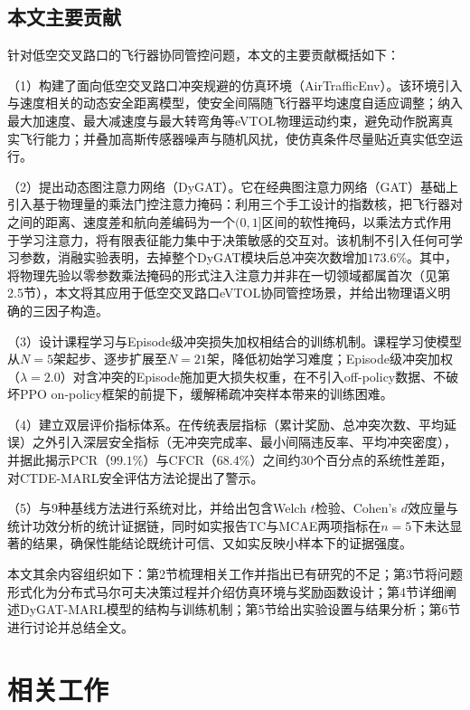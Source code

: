\documentclass[12pt,a4paper,UTF8]{ctexart}
\begin{document}
\subsection{本文主要贡献}

针对低空交叉路口的飞行器协同管控问题，本文的主要贡献概括如下：

（1）构建了面向低空交叉路口冲突规避的仿真环境（AirTrafficEnv）。该环境引入与速度相关的动态安全距离模型，使安全间隔随飞行器平均速度自适应调整；纳入最大加速度、最大减速度与最大转弯角等eVTOL物理运动约束，避免动作脱离真实飞行能力；并叠加高斯传感器噪声与随机风扰，使仿真条件尽量贴近真实低空运行。

（2）提出动态图注意力网络（DyGAT）。它在经典图注意力网络（GAT）基础上引入基于物理量的乘法门控注意力掩码：利用三个手工设计的指数核，把飞行器对之间的距离、速度差和航向差编码为一个$(0,1]$区间的软性掩码，以乘法方式作用于学习注意力，将有限表征能力集中于决策敏感的交互对。该机制不引入任何可学习参数，消融实验表明，去掉整个DyGAT模块后总冲突次数增加$173.6\%$。其中，将物理先验以零参数乘法掩码的形式注入注意力并非在一切领域都属首次（见第2.5节），本文将其应用于低空交叉路口eVTOL协同管控场景，并给出物理语义明确的三因子构造。

（3）设计课程学习与Episode级冲突损失加权相结合的训练机制。课程学习使模型从$N=5$架起步、逐步扩展至$N=21$架，降低初始学习难度；Episode级冲突加权（$\lambda=2.0$）对含冲突的Episode施加更大损失权重，在不引入off-policy数据、不破坏PPO on-policy框架的前提下，缓解稀疏冲突样本带来的训练困难。

（4）建立双层评价指标体系。在传统表层指标（累计奖励、总冲突次数、平均延误）之外引入深层安全指标（无冲突完成率、最小间隔违反率、平均冲突密度），并据此揭示PCR（$99.1\%$）与CFCR（$68.4\%$）之间约30个百分点的系统性差距，对CTDE-MARL安全评估方法论提出了警示。

（5）与9种基线方法进行系统对比，并给出包含Welch $t$检验、Cohen's $d$效应量与统计功效分析的统计证据链，同时如实报告TC与MCAE两项指标在$n=5$下未达显著的结果，确保性能结论既统计可信、又如实反映小样本下的证据强度。

本文其余内容组织如下：第2节梳理相关工作并指出已有研究的不足；第3节将问题形式化为分布式马尔可夫决策过程并介绍仿真环境与奖励函数设计；第4节详细阐述DyGAT-MARL模型的结构与训练机制；第5节给出实验设置与结果分析；第6节进行讨论并总结全文。

\section{相关工作}
\end{document}

